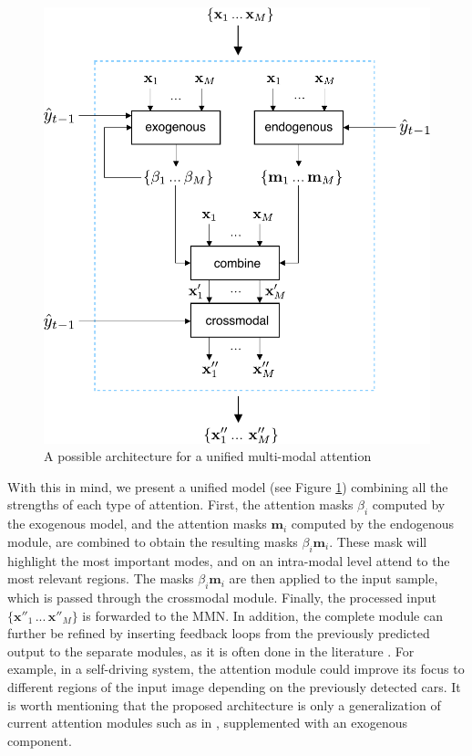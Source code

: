 \begin{figure}[hbt!]
\centering
\includegraphics[scale=0.75]{figures/unified}
\caption{A possible architecture for a unified multi-modal attention}
\label{fig:complete-model}
\end{figure}

With this in mind, we present a unified model (see Figure \ref{fig:complete-model}) combining all the strengths of each type of attention. First, the attention masks $\beta_i$ computed by the exogenous model, and the attention masks $\mathbf{m}_i$ computed by the endogenous module, are combined to obtain the resulting masks $\beta_i\mathbf{m}_i$. These mask will highlight the most important modes, and on an intra-modal level attend to the most relevant regions. The masks $\beta_i\mathbf{m}_i$ are then applied to the input sample, which is passed through the crossmodal module. Finally, the processed input $\{\mathbf{x}''_1\,...\,\mathbf{x}''_M\}$ is forwarded to the MMN. In addition, the complete module can further be refined by inserting feedback loops from the previously predicted output to the separate modules, as it is often done in the literature \citep{afouras, attention-need, bahdanau}. For example, in a self-driving system, the attention module could improve its focus to different regions of the input image depending on the previously detected cars. It is worth mentioning that the proposed architecture is only a generalization of current attention modules such as in \citep{afouras}, supplemented with an exogenous component.


